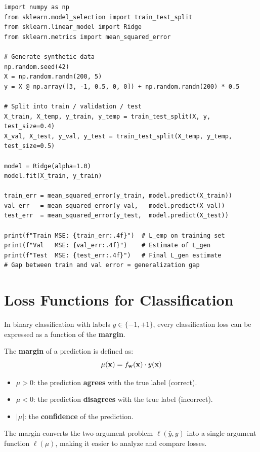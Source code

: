 \begin{lstlisting}[style=pythonstyle]
import numpy as np
from sklearn.model_selection import train_test_split
from sklearn.linear_model import Ridge
from sklearn.metrics import mean_squared_error

# Generate synthetic data
np.random.seed(42)
X = np.random.randn(200, 5)
y = X @ np.array([3, -1, 0.5, 0, 0]) + np.random.randn(200) * 0.5

# Split into train / validation / test
X_train, X_temp, y_train, y_temp = train_test_split(X, y, test_size=0.4)
X_val, X_test, y_val, y_test = train_test_split(X_temp, y_temp, test_size=0.5)

model = Ridge(alpha=1.0)
model.fit(X_train, y_train)

train_err = mean_squared_error(y_train, model.predict(X_train))
val_err   = mean_squared_error(y_val,   model.predict(X_val))
test_err  = mean_squared_error(y_test,  model.predict(X_test))

print(f"Train MSE: {train_err:.4f}")  # L_emp on training set
print(f"Val   MSE: {val_err:.4f}")    # Estimate of L_gen
print(f"Test  MSE: {test_err:.4f}")   # Final L_gen estimate
# Gap between train and val error = generalization gap
\end{lstlisting}

\section*{Loss Functions for Classification}

In binary classification with labels $y \in \{-1, +1\}$, every classification loss can be expressed as a function of the \textbf{margin}.

\begin{definition}[Margin]
The \textbf{margin} of a prediction is defined as:
$$\mu(\mathbf{x}) = f_{\mathbf{w}}(\mathbf{x}) \cdot y(\mathbf{x})$$
\begin{itemize}
    \item $\mu > 0$: the prediction \textbf{agrees} with the true label (correct).
    \item $\mu < 0$: the prediction \textbf{disagrees} with the true label (incorrect).
    \item $|\mu|$: the \textbf{confidence} of the prediction.
\end{itemize}
The margin converts the two-argument problem $\ell(\hat{y}, y)$ into a single-argument function $\ell(\mu)$, making it easier to analyze and compare losses.
\end{definition}

